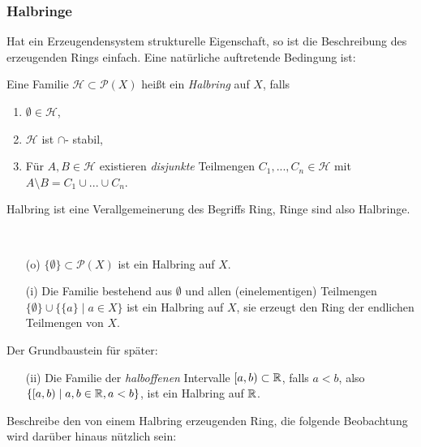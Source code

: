 \subsubsection{Halbringe}
Hat ein Erzeugendensystem strukturelle Eigenschaft, so ist die Beschreibung des erzeugenden Rings einfach. Eine natürliche auftretende Bedingung ist:
\begin{definition}
\begin{mdframed}
Eine Familie $\mathcal{H}\subset \mathcal{P}(X)$ heißt ein \emph{Halbring} auf $X$, falls
\begin{enumerate}[(\roman*), topsep=3pt, itemsep=0pt]
	\item $\emptyset \in \mathcal{H}$,
	\item $\mathcal{H}$ ist $\cap$- stabil,
	\item Für $A,B \in \mathcal{H}$ existieren \emph{disjunkte} Teilmengen $C_1,...,C_n \in \mathcal{H}$ mit $A\setminus B = C_1 \cup ...\cup C_n$.
\end{enumerate}
\end{mdframed}
\end{definition}
\begin{remark}
Halbring ist eine Verallgemeinerung des Begriffs Ring, Ringe sind also Halbringe.
\end{remark}
\begin{example} \
\begin{enumerate}
	\item[(o)] $\{ \emptyset\} \subset \mathcal{P}(X)$ ist ein Halbring auf $X$.
	\item[(i)] Die Familie bestehend aus $\emptyset$ und allen (einelementigen) Teilmengen $\{\emptyset\} \cup \{ \{a\} \mid a \in X \}$  ist ein Halbring auf $X$, sie erzeugt den Ring der endlichen Teilmengen von $X$.
\end{enumerate}
Der Grundbaustein für später:
\begin{enumerate}
	\item[(ii)] Die Familie der \emph{halboffenen} Intervalle $[a,b) \subset \mathbb{R}$, falls $a<b$, also $\{[a,b) \mid a,b \in \mathbb{R}, a<b\}$, ist ein Halbring auf $\mathbb{R}$.
\end{enumerate}
\end{example}
Beschreibe den von einem Halbring erzeugenden Ring, die folgende Beobachtung wird darüber hinaus nützlich sein:

